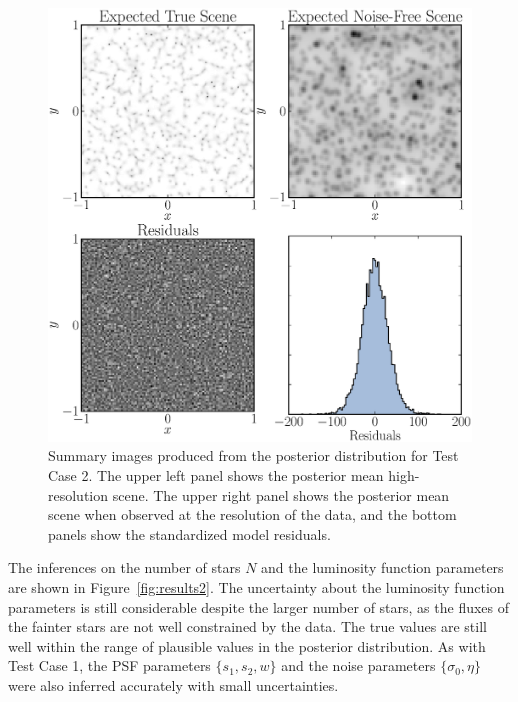 \documentclass[12pt, preprint]{aastex}
\begin{document}
\begin{figure}[ht!]
\begin{center}
\includegraphics[width=\textwidth]{Figures/summaries.eps}
\end{center}
\caption{Summary images produced from the posterior distribution for Test Case 2. The upper left panel shows the posterior
mean high-resolution scene. The upper right panel shows the posterior mean scene
when observed at the resolution of the data, and the bottom panels show the
standardized model residuals.
\label{fig:summaries}}
\end{figure}

The inferences on the number of stars $N$ and the luminosity function parameters
are shown in Figure~\ref{fig:results2}. The uncertainty about the luminosity
function parameters is still considerable despite the larger number of stars, as the fluxes of the fainter stars
are not well constrained by the data. The true values are still well within
the range of plausible values in the posterior distribution.
As with Test Case 1, the PSF parameters $\{s_1, s_2, w\}$ and the noise parameters $\{\sigma_0, \eta\}$ were also inferred accurately with small uncertainties.
\end{document}
